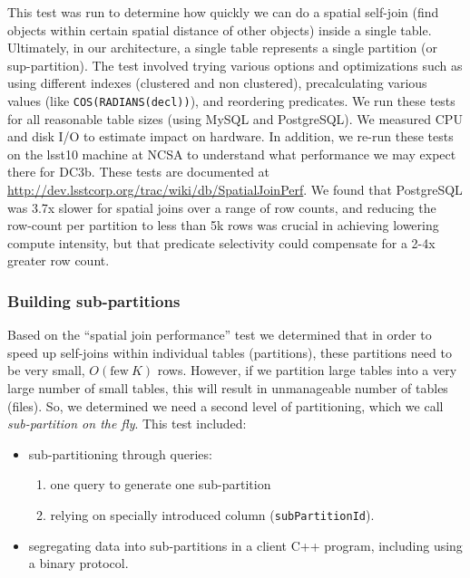 \documentclass[DM,lsstdraft,toc]{lsstdoc}
\begin{document}
This test was run to determine how quickly we can do a spatial self-join
(find objects within certain spatial distance of other objects) inside a
single table. Ultimately, in our architecture, a single table represents
a single partition (or sup-partition). The test involved trying various
options and optimizations such as using different indexes (clustered and
non clustered), precalculating various values (like
\texttt{COS(RADIANS(decl))}), and reordering predicates. We run these
tests for all reasonable table sizes (using MySQL and PostgreSQL). We
measured CPU and disk I/O to estimate impact on hardware. In addition,
we re-run these tests on the lsst10 machine at NCSA to understand what
performance we may expect there for DC3b. These tests are documented at
\url{http://dev.lsstcorp.org/trac/wiki/db/SpatialJoinPerf}. We found
that PostgreSQL was 3.7x slower for spatial joins over a range of row
counts, and reducing the row-count per partition to less than 5k rows
was crucial in achieving lowering compute intensity, but that predicate
selectivity could compensate for a 2-4x greater row count.

\subsubsection{Building sub-partitions}\label{building-sub-partitions}

Based on the ``spatial join performance'' test we determined that in
order to speed up self-joins within individual tables (partitions),
these partitions need to be very small, \(O(\mathrm{few~} K)\) rows.
However, if we partition large tables into a very large number of small
tables, this will result in unmanageable number of tables (files). So,
we determined we need a second level of partitioning, which we call
\emph{sub-partition on the fly}. This test included:

\begin{itemize}
\item
  sub-partitioning through queries:

  \begin{enumerate}
  \def\labelenumi{\arabic{enumi}.}
  \item
    one query to generate one sub-partition
  \item
    relying on specially introduced column (\texttt{subPartitionId}).
  \end{enumerate}
\item
  segregating data into sub-partitions in a client C++ program,
  including using a binary protocol.
\end{itemize}
\end{document}
